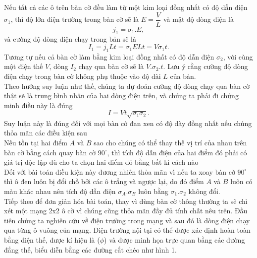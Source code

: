 \begin{loigiai}
Nếu tất cả các ô trên bàn cờ đều làm từ một kim loại đồng nhất có độ dẫn điện $\sigma_1$, thì độ lớn điện trường trong bàn cờ sẽ là $E=\dfrac{V}{L}$ và mật độ dòng điện là 
$$j_1=\sigma_1.E,$$ và cường độ dòng điện chạy trong bản sẽ là
$$I_1=j_1Lt=\sigma_1ELt=V\sigma_1t.$$
Tương tự nếu cả bàn cờ làm bằng kim loại đồng nhất có độ dẫn điện $\sigma_2$, với cùng một điện thế $V$, dòng $I_2$ chạy qua bàn cờ sẽ là $V.\sigma_2.t$. Lưu ý rằng cường độ dòng điện chạy trong bàn cờ không phụ thuộc vào độ dài $L$ của bản.
\\Theo hướng suy luận như thế, chúng ta dự đoán cường độ dòng chạy qua bàn cờ thật sẽ là trung bình nhân của hai dòng điện trên, và chúng ta phải đi chứng minh điều này là đúng 
$$I=Vt\sqrt{\sigma_1 \sigma_2}.$$
 Suy luận này là đúng đối với mọi bàn cờ đan xen có độ dày đồng nhất nếu chúng thỏa mãn các điều kiện sau
   \\ Nếu tồn tại hai điểm $A$ và $B$ sao cho chúng có thể thay thế vị trí của nhau trên bàn cờ bằng cách quay bàn cờ $90^\circ$, thì  tích độ dẫn điện của hai điểm đó phải có giá trị độc lập dù cho ta chọn hai điểm đó bằng bất kì cách nào
    \\ Đối với bài toán điều kiện này đương nhiên thỏa mãn vì nếu ta xoay bàn cờ $90^\circ$ thì ô đen luôn bị đổi chỗ bởi các ô trắng và ngược lại, do đó điểm $A$ và $B$ luôn có màu khác nhau nên tích độ dẫn điện $\sigma_A.\sigma_B$ luôn bằng $\sigma_1.\sigma_2$ không đổi.
    \\ Tiếp theo để đơn giản hóa bài toán, thay vì dùng bàn cờ thông thường ta sẽ chỉ xét một mạng 2x2 ô cờ vì chúng cũng thỏa mãn đầy đủ tính chất nêu trên. Đầu tiên chúng ta nghiên cứu về điện trường trong mạng và sau đó là dòng điện chạy qua từng ô vuông của mạng. Điện trường nội tại có thể được xác định hoàn toàn bằng điện thế, được kí hiệu là ($\phi$) và được minh họa trực quan bằng các đường đẳng thế, biểu diễn bằng các đường cắt chéo như hình 1.
    \begin{center}
        


\begin{tikzpicture}[x=0.75pt,y=0.75pt,yscale=-0.8,xscale=0.8]


\end{tikzpicture}
\end{center}
\end{loigiai}

